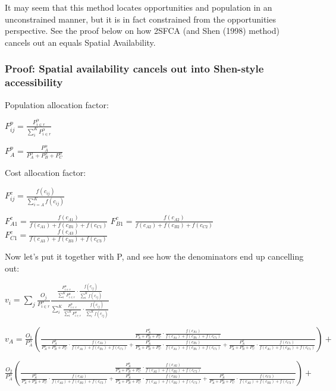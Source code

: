 \documentclass[]{elsarticle} %
\begin{document}
It may seem that this method locates opportunities and population in an
unconstrained manner, but it is in fact constrained from the
opportunities perspective. See the proof below on how 2SFCA (and Shen
(1998) method) cancels out an equals Spatial Availability.

\hypertarget{proof-spatial-availability-cancels-out-into-shen-style-accessibility}{%
\subsubsection{Proof: Spatial availability cancels out into Shen-style
accessibility}\label{proof-spatial-availability-cancels-out-into-shen-style-accessibility}}

Population allocation factor:

\(F^p_{ij} = \frac{P_{i\in r}^\alpha}{\sum_{i}^K P_{i\in r}^\alpha}\)

\(F^p_{A} = \frac{P_{A}^\alpha}{P_{A}^\alpha + P_{B}^\alpha + P_{C}^\alpha}\)

Cost allocation factor:

\(F^c_{ij} = \frac{f(c_{ij})}{\sum_{i=A}^K f(c_{ij})}\)

\(F^c_{A1} = \frac{f(c_{A1})}{f(c_{A1})+f(c_{B1})+f(c_{C1})}\)
\(F^c_{B1} = \frac{f(c_{A2})}{f(c_{A2})+f(c_{B2})+f(c_{C2})}\)
\(F^c_{C1} = \frac{f(c_{A3})}{f(c_{A3})+f(c_{B3})+f(c_{C3})}\)

Now let's put it together with P, and see how the denominators end up
cancelling out:

\(v_{i} = \sum_{j}\frac{O_j}{P_{i\in r}^\alpha}\frac{\frac{P_{i\in r}^\alpha}{\sum_{i}^K P_{i\in r}^\alpha} \cdot \frac{f(c_{ij})}{\sum_{i}^K f(c_{ij})}}{\sum_{i}^K \frac{P_{i\in r}^\alpha}{\sum_{i}^K P_{i\in r}^\alpha} \cdot \frac{f(c_{ij})}{\sum_{i}^K f(c_{ij})}}\)

\(v_{A} = \frac{O_1}{P_{A}^\alpha}(\frac{\frac{P_{A}^\alpha}{P_{A}^\alpha+P_{B}^\alpha+P_{C}^\alpha} \cdot \frac{f(c_{A1})}{f(c_{A1})+f(c_{B1})+f(c_{C1})}}{\frac{P_{A}^\alpha}{P_{A}^\alpha+P_{B}^\alpha+P_{C}^\alpha} \cdot \frac{f(c_{A1})}{f(c_{A1})+f(c_{B1})+f(c_{C1})} + \frac{P_{A}^\alpha}{P_{A}^\alpha+P_{B}^\alpha+P_{C}^\alpha} \cdot \frac{f(c_{B1})}{f(c_{A1})+f(c_{B1})+f(c_{C1})}+ \frac{P_{A}^\alpha}{P_{A}^\alpha+P_{B}^\alpha+P_{C}^\alpha} \cdot \frac{f(c_{C1})}{f(c_{A1})+f(c_{B1})+f(c_{C1})}}) +\)

\(\frac{O_2}{P_{A}^\alpha}(\frac{\frac{P_{A}^\alpha}{P_{A}^\alpha+P_{B}^\alpha+P_{C}^\alpha} \cdot \frac{f(c_{A2})}{f(c_{A2})+f(c_{B2})+f(c_{C2})}}{\frac{P_{A}^\alpha}{P_{A}^\alpha+P_{B}^\alpha+P_{C}^\alpha} \cdot \frac{f(c_{A2})}{f(c_{A2})+f(c_{B2})+f(c_{C2})} + \frac{P_{A}^\alpha}{P_{A}^\alpha+P_{B}^\alpha+P_{C}^\alpha} \cdot \frac{f(c_{B2})}{f(c_{A2})+f(c_{B2})+f(c_{C2})}+\frac{P_{A}^\alpha}{P_{A}^\alpha+P_{B}^\alpha+P_{C}^\alpha} \cdot \frac{f(c_{C2})}{f(c_{A2})+f(c_{B2})+f(c_{C2})}} )+\)
\end{document}
